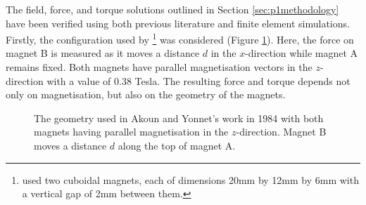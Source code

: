 The field, force, and torque solutions outlined in Section \ref{sec:p1methodology} have been verified using both previous literature and finite element simulations. Firstly, the configuration used by \textcite{Akoun1984}\footnote{\textcite{Akoun1984} used two cuboidal magnets, each of dimensions 20mm by 12mm by 6mm with a vertical gap of 2mm between them.} was considered (Figure \ref{fig:p1akounyonnet}). Here, the force on magnet B is measured as it moves a distance \(d\) in the \(x\)-direction while magnet A remains fixed. Both magnets have parallel magnetisation vectors in the \(z\)-direction with a value of 0.38 Tesla. The resulting force and torque depends not only on magnetisation, but also on the geometry of the magnets.
\begin{figure}
	\centering
	
	\caption{The geometry used in Akoun and Yonnet's work in 1984 \cite{Akoun1984} with both magnets having parallel magnetisation in the \(z\)-direction. Magnet B moves a distance \(d\) along the top of magnet A.}
	\label{fig:p1akounyonnet}
\end{figure}

